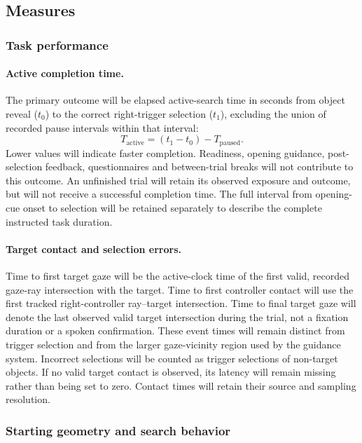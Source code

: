 \documentclass[11pt,letterpaper]{article}
\begin{document}
\subsection{Measures}
\subsubsection{Task performance}
\paragraph{Active completion time.} The primary outcome will be elapsed active-search time in seconds from object reveal ($t_0$) to the correct right-trigger selection ($t_1$), excluding the union of recorded pause intervals within that interval:
\[
T_{\mathrm{active}}=(t_1-t_0)-T_{\mathrm{paused}}.
\]
Lower values will indicate faster completion. Readiness, opening guidance, post-selection feedback, questionnaires and between-trial breaks will not contribute to this outcome. An unfinished trial will retain its observed exposure and outcome, but will not receive a successful completion time. The full interval from opening-cue onset to selection will be retained separately to describe the complete instructed task duration.

\paragraph{Target contact and selection errors.} Time to first target gaze will be the active-clock time of the first valid, recorded gaze-ray intersection with the target. Time to first controller contact will use the first tracked right-controller ray--target intersection. Time to final target gaze will denote the last observed valid target intersection during the trial, not a fixation duration or a spoken confirmation. These event times will remain distinct from trigger selection and from the larger gaze-vicinity region used by the guidance system. Incorrect selections will be counted as trigger selections of non-target objects. If no valid target contact is observed, its latency will remain missing rather than being set to zero. Contact times will retain their source and sampling resolution.

\subsubsection{Starting geometry and search behavior}
\end{document}
